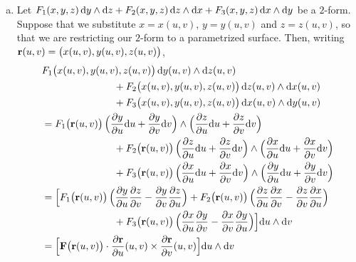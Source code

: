 \begin{eg}
\begin{enumerate}[(a)]
\item 
Let $F_1(x,y,z)\,\mathrm{d}y\wedge\mathrm{d}z
 + F_2(x,y,z)\,\mathrm{d}z\wedge\mathrm{d}x
 + F_3(x,y,z)\,\mathrm{d}x\wedge\mathrm{d}y$ 
be a $2$-form. Suppose that we substitute $x=x(u,v)$, $y=y(u,v)$ and 
$z=z(u,v)$, so that we are restricting our $2$-form to a parametrized surface.
Then, writing $\mathbf{r}(u,v) = \big(x(u,v),y(u,v),z(u,v)\big)$,
\begin{align*}
&F_1\big(x(u,v),y(u,v),z(u,v)\big)\,\mathrm{d}y(u,v)\wedge\mathrm{d}z(u,v)
   \\&\hskip1in
  + F_2\big(x(u,v),y(u,v),z(u,v)\big)\,\mathrm{d}z(u,v)\wedge\mathrm{d}x(u,v) 
   \\&\hskip1in
  + F_3\big(x(u,v),y(u,v),z(u,v)\big)\,\mathrm{d}x(u,v)\wedge\mathrm{d}y(u,v) \\
&=F_1\big(\mathbf{r}(u,v)\big)\,
    \Big(\frac{\partial y}{\partial u}\mathrm{d}u
        +\frac{\partial y}{\partial v}\mathrm{d}v\Big)\wedge
    \Big(\frac{\partial z}{\partial u}\mathrm{d}u
        +\frac{\partial z}{\partial v}\mathrm{d}v\Big)
   \\&\hskip1in
  + F_2\big(\mathbf{r}(u,v)\big)\,
    \Big(\frac{\partial z}{\partial u}\mathrm{d}u
        +\frac{\partial z}{\partial v}\mathrm{d}v\Big)\wedge
    \Big(\frac{\partial x}{\partial u}\mathrm{d}u
        +\frac{\partial x}{\partial v}\mathrm{d}v\Big) 
   \\&\hskip1in
  + F_3\big(\mathbf{r}(u,v)\big)\,
    \Big(\frac{\partial x}{\partial u}\mathrm{d}u
        +\frac{\partial x}{\partial v}\mathrm{d}v\Big)\wedge
    \Big(\frac{\partial y}{\partial u}\mathrm{d}u
        +\frac{\partial y}{\partial v}\mathrm{d}v\Big) \\
&=\Big[F_1\big(\mathbf{r}(u,v)\big)\,
    \Big(\frac{\partial y}{\partial u}\frac{\partial z}{\partial v}
        -\frac{\partial y}{\partial v}\frac{\partial z}{\partial u}\Big)
      +F_2\big(\mathbf{r}(u,v)\big)\,
    \Big(\frac{\partial z}{\partial u}\frac{\partial x}{\partial v}
        -\frac{\partial z}{\partial v}\frac{\partial x}{\partial u}\Big)
   \\&\hskip1in
      +F_3\big(\mathbf{r}(u,v)\big)\,
    \Big(\frac{\partial x}{\partial u}\frac{\partial y}{\partial v}
        -\frac{\partial x}{\partial v}\frac{\partial y}{\partial u}\Big)
        \Big] \mathrm{d}u\wedge\mathrm{d}v \\
&=\Big[\mathbf{F}\big(\mathbf{r}(u,v)\big)\cdot \frac{\partial\mathbf{r}}{\partial u}(u,v)
                 \times \frac{\partial\mathbf{r}}{\partial v}(u,v)\Big] 
         \mathrm{d}u\wedge\mathrm{d}v
\end{align*}


\end{enumerate}
\end{eg}



